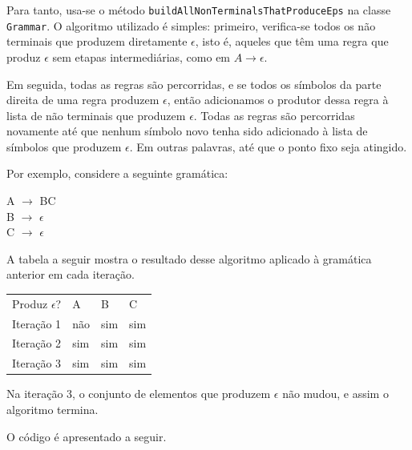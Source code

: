 \documentclass[11pt]{article}
\begin{document}
Para tanto, usa-se o método \texttt{buildAllNonTerminalsThatProduceEps} na classe
\texttt{Grammar}. O algoritmo utilizado é simples: primeiro, verifica-se todos os não
terminais que produzem diretamente \(\epsilon\), isto é, aqueles que têm uma regra
que produz \(\epsilon\) sem etapas intermediárias, como em \(A \rightarrow \epsilon\).

Em seguida, todas as regras são percorridas, e se todos os símbolos da parte
direita de uma regra produzem \(\epsilon\), então adicionamos o produtor dessa regra
à lista de não terminais que produzem \(\epsilon\). Todas as regras são percorridas
novamente até que nenhum símbolo novo tenha sido adicionado à lista de símbolos
que produzem \(\epsilon\). Em outras palavras, até que o ponto fixo seja atingido.

Por exemplo, considere a seguinte gramática:

\begin{center}
A \(\rightarrow\) BC \\
B \(\rightarrow\) \(\epsilon\) \\
C \(\rightarrow\) \(\epsilon\)
\end{center}

A tabela a seguir mostra o resultado desse algoritmo aplicado à gramática
anterior em cada iteração.

\begin{center}
\begin{tabular}{llll}
Produz \(\epsilon\)? & A & B & C\\
Iteração 1 & não & sim & sim\\
Iteração 2 & sim & sim & sim\\
Iteração 3 & sim & sim & sim\\
\end{tabular}
\end{center}

Na iteração 3, o conjunto de elementos que produzem \(\epsilon\) não mudou, e assim
o algoritmo termina.

O código é apresentado a seguir.
\end{document}
